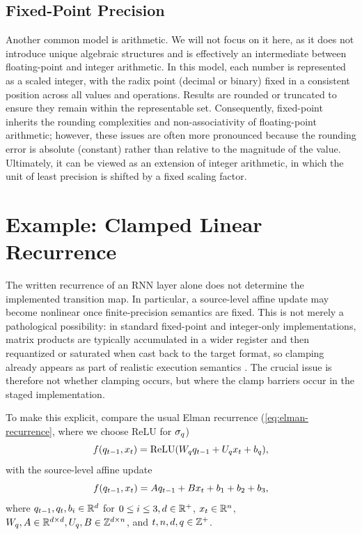 \documentclass{article}
\begin{document}
\subsection{Fixed-Point Precision}
Another common model is  arithmetic. 
We will not focus on it here, as it does not introduce unique algebraic structures and is effectively an intermediate between floating-point and integer arithmetic. In this model, each number is represented as a scaled integer, with the radix point (decimal or binary) fixed in a consistent position across all values and operations. Results are rounded or truncated to ensure they remain within the representable set. Consequently, fixed-point inherits the rounding complexities and non-associativity of floating-point arithmetic; however, these issues are often more pronounced because the rounding error is absolute (constant) rather than relative to the magnitude of the value. Ultimately, it can be viewed as an extension of integer arithmetic, in which the unit of least precision is shifted by a fixed scaling factor.

\section{Example: Clamped Linear Recurrence}\label{app:nominally-linear}

The written recurrence of an RNN layer alone does not determine the implemented transition map. In particular, a source-level affine update may become nonlinear once finite-precision semantics are fixed. 
This is not merely a pathological possibility: in standard fixed-point and integer-only implementations, matrix products are typically accumulated in a wider register and then requantized or saturated when cast back to the target format, so clamping already appears as part of realistic execution semantics \citep{jacob2018quantization, kim2021ibert}. 
The crucial issue is therefore not whether clamping occurs, but where the clamp barriers occur in the staged implementation.

To make this explicit, compare the usual Elman recurrence (\cref{eq:elman-recurrence}, where we choose $\mathrm{ReLU}$ for $\sigma_q$)
\begin{equation}\label{eq:ex-rnn-recfn}
f(q_{t-1},x_t)=\mathrm{ReLU}(W_q q_{t-1}+U_q x_t+b_q),
\end{equation}
with the source-level affine update
\begin{equation}\label{eq:ex-ssm-recfn}
f(q_{t-1},x_t) = A q_{t-1}+B x_t+b_1+b_2+b_3,
\end{equation}
where $q_{t-1},q_t, b_i \in \mathbb{R}^d$ for $0\leq i\leq 3, d\in\mathbb{R}^+$, $x_t\in\mathbb{R}^n$, $W_q, A\in \mathbb{R}^{d\times d}, U_q, B\in\mathbb{Z}^{d\times n}$, and $t,n,d,q \in \mathbb{Z}^+$.
\end{document}
